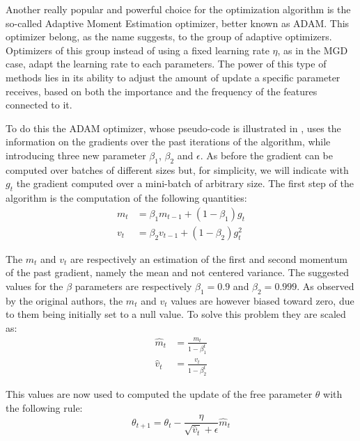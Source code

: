 Another really popular and powerful choice for the optimization algorithm is the so-called Adaptive Moment Estimation optimizer, better known as ADAM. This optimizer belong, as the name suggests, to the group of adaptive optimizers. Optimizers of this group instead of using a fixed learning rate $\eta$, as in the MGD case, adapt the learning rate to each parameters.
The power of this type of methods lies in its ability to adjust the amount of update a specific parameter receives, based on both the importance and the frequency of the features connected to it. 

To do this the ADAM optimizer, whose pseudo-code is illustrated in , uses the information on the gradients over the past iterations of the algorithm, while introducing three new parameter $\beta_1$, $\beta_2$ and $\epsilon$. As before the gradient can be computed over batches of different sizes but, for simplicity, we will indicate with $g_t$ the gradient computed over a mini-batch of arbitrary size. The first step of the algorithm is the computation of the following quantities:
\begin{equation}
\begin{aligned}
m_{t} &=\beta_{1} m_{t-1}+\left(1-\beta_{1}\right) g_{t} \\
v_{t} &=\beta_{2} v_{t-1}+\left(1-\beta_{2}\right) g_{t}^{2}
\end{aligned}
\end{equation}

The $m_t$ and $v_t$ are respectively an estimation of the first and second momentum of the past gradient, namely the mean and not centered variance. The suggested values for the $\beta$ parameters are respectively $\beta_1=0.9$ and $\beta_2=0.999$. As observed by the original authors, the $m_t$ and $v_t$ values are however biased toward zero, due to them being initially set to a null value. To solve this problem they are scaled as:
\begin{equation}
\begin{aligned}
\hat{m}_{t} &=\frac{m_{t}}{1-\beta_{1}^{t}} \\
\hat{v}_{t} &=\frac{v_{t}}{1-\beta_{2}^{t}}
\end{aligned}
\end{equation}

This values are now used to computed the update of the free parameter $\theta$ with the following rule:
\begin{equation}
\theta_{t+1}=\theta_{t}-\frac{\eta}{\sqrt{\hat{v}_{t}}+\epsilon} \hat{m}_{t}
\end{equation}

